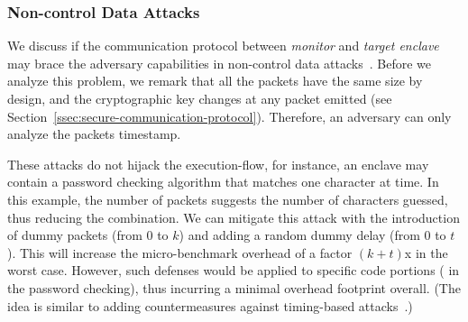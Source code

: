 

\subsubsection{Non-control Data Attacks}
\label{sssec:non-control-data}


We discuss if the communication protocol between \emph{monitor} and 
\emph{target enclave} may brace the adversary capabilities in non-control data 
attacks~\citep{269251,hu2015automatic}.
Before we analyze this problem, we remark that all the packets have the same 
size by design, and the cryptographic key changes at any packet emitted (see 
Section~\ref{ssec:secure-communication-protocol}).
Therefore, an adversary can only analyze the packets timestamp.

These attacks do not hijack the execution-flow, for instance, an enclave may 
contain a password checking algorithm that matches one character at time.
In this example, the number of packets suggests the number of characters 
guessed, thus reducing the combination.
We can mitigate this attack with the introduction of dummy packets (from $0$ to 
$k$) and adding a random dummy delay (from $0$ to $t$).
This will increase the micro-benchmark overhead of a factor $(k + t)$x in the 
worst case.
However, such defenses would be applied to specific code portions (\eg
in the password checking), thus incurring a minimal overhead footprint
overall.  (The idea is similar to adding countermeasures against
timing-based attacks~\citep{10.1007/978-3-642-25385-0_26}.)



